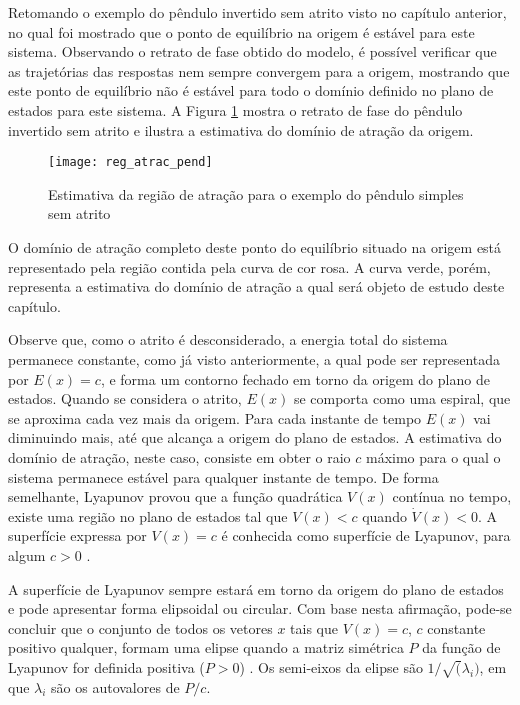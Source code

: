 Retomando o exemplo do pêndulo invertido sem atrito visto no capítulo anterior, no qual foi mostrado que o ponto de equilíbrio na origem é estável para este sistema. Observando o retrato de fase obtido do modelo, é possível verificar que as trajetórias das respostas nem sempre convergem para a origem, mostrando que este ponto de equilíbrio não é estável para todo o domínio definido no plano de estados para este sistema. A Figura \ref{fig:reg_atrac_pend} mostra o  retrato de fase do pêndulo invertido sem atrito e ilustra a estimativa do domínio de atração da origem.
\begin{figure}[htbp]
	\centering
	\texttt{[image: reg\_atrac\_pend]}
	\caption{Estimativa da região de atração para o exemplo do pêndulo simples sem atrito}
	\label{fig:reg_atrac_pend}
\end{figure}
O domínio de atração completo deste ponto do equilíbrio situado na origem está representado pela região contida pela curva de cor rosa. A curva verde, porém, representa a estimativa do domínio de atração a qual será objeto de estudo deste capítulo.

Observe que, como o atrito é desconsiderado, a energia total do sistema permanece constante, como já visto anteriormente, a qual pode ser representada por $E(x) = c$, e forma um contorno fechado em torno da origem do plano de estados. Quando se considera o atrito, $E(x)$ se comporta como uma espiral, que se aproxima cada vez mais da origem. Para cada instante de tempo $E(x)$ vai diminuindo mais, até que alcança a origem do plano de estados. A estimativa do domínio de atração, neste caso, consiste em obter o raio $c$ máximo para o qual o sistema permanece estável para qualquer instante de tempo. De forma semelhante, Lyapunov provou que a função quadrática $V(x)$ contínua no tempo, existe uma região no plano de estados tal que $V(x) < c$ quando $\dot{V}(x) < 0$. A superfície expressa por $V(x) = c$ é conhecida como superfície de Lyapunov, para algum $c > 0$ \cite{bookkhalil:2003}.

A superfície de Lyapunov sempre estará em torno da origem do plano de estados e pode apresentar forma elipsoidal ou circular. Com base nesta afirmação, pode-se concluir que o conjunto de todos os vetores $x$ tais que $V(x) = c$, $c$ constante positivo qualquer, formam uma elipse quando a matriz simétrica $P$ da função de Lyapunov for definida positiva ($P > 0$) \cite{bookboydl:1994}. Os semi-eixos da elipse são $1/\sqrt(\lambda_i)$, em que $\lambda_i$ são os autovalores de $P/c$.

